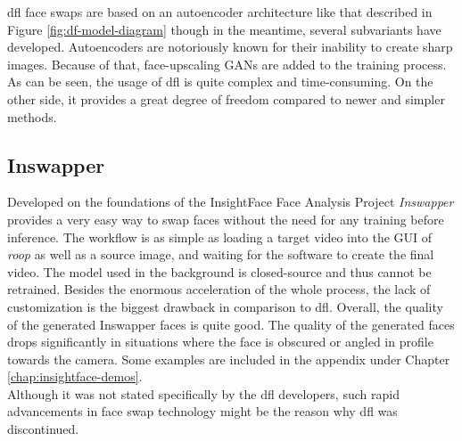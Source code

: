 \documentclass[
  a4paper,  %
  twoside,  %
  bibliography=totoc,
  headsepline,
  cleardoublepage=empty,
  parskip=half,
  draft=false
]{scrbook}
\begin{document}
\gls{dfl} face swaps are based on an autoencoder architecture like that described in Figure \ref{fig:df-model-diagram} though in the meantime, several subvariants have developed. Autoencoders are notoriously known for their inability to create sharp images. Because of that, face-upscaling GANs are added to the training process. \\
As can be seen, the usage of \gls{dfl} is quite complex and time-consuming. On the other side, it provides a great degree of freedom compared to newer and simpler methods.
\subsection{Inswapper}
\label{sec:roop}
Developed on the foundations of the InsightFace Face Analysis Project \cite{insightfaceInsightFaceWebsite} \textit{Inswapper} provides a very easy way to swap faces without the need for any training before inference. The workflow is as simple as loading a target video into the GUI of \textit{roop} \cite{sangwanRoop2023} as well as a source image, and waiting for the software to create the final video. The model used in the background is closed-source and thus cannot be retrained. Besides the enormous acceleration of the whole process, the lack of customization is the biggest drawback in comparison to \gls{dfl}. Overall, the quality of the generated Inswapper faces is quite good. The quality of the generated faces drops significantly in situations where the face is obscured or angled in profile towards the camera. Some examples are included in the appendix under Chapter \ref{chap:insightface-demos}. \\
Although it was not stated specifically by the \gls{dfl} developers, such rapid advancements in face swap technology might be the reason why \gls{dfl} was discontinued. 
\end{document}
